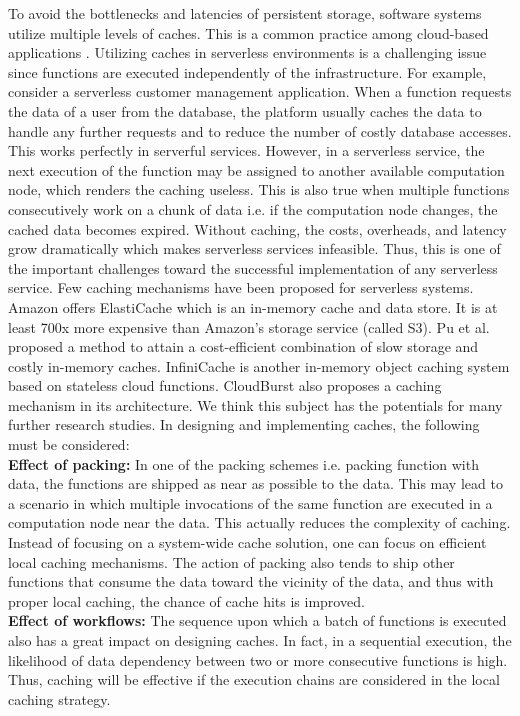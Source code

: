 \label{sec:caching}
To avoid the bottlenecks and latencies of persistent storage, software systems utilize multiple levels of caches. This is a common practice among cloud-based applications . Utilizing caches in serverless environments is a challenging issue since functions are executed independently of the infrastructure. For example, consider a serverless customer management application. When a function requests the data of a user from the database, the platform usually caches the data to handle any further requests and to reduce the number of costly database accesses. This works perfectly in serverful services. However, in a serverless service, the next execution of the function may be assigned to another available computation node, which renders the caching useless. This is also true when multiple functions consecutively work on a chunk of data i.e. if the computation node changes, the cached data becomes expired. Without caching, the costs, overheads, and latency grow dramatically which makes serverless services infeasible. Thus, this is one of the important challenges toward the successful implementation of any serverless service. Few caching mechanisms have been proposed for serverless systems. Amazon offers ElastiCache  which is an in-memory cache and data store. It is at least 700x more expensive than Amazon's storage service (called S3). Pu et al.  proposed a method to attain a cost-efficient combination of slow storage and costly in-memory caches. InfiniCache  is another in-memory object caching system based on stateless cloud functions. CloudBurst  also proposes a caching mechanism in its architecture.  
We think this subject has the potentials for many further research studies. In designing and implementing caches, the following must be considered:
\\
\noindent \textbf{Effect of packing:} In one of the packing schemes i.e. packing function with data, the functions are shipped as near as possible to the data. This may lead to a scenario in which multiple invocations of the same function are executed in a computation node near the data. This actually reduces the complexity of caching. Instead of focusing on a system-wide cache solution, one can focus on efficient local caching mechanisms. The action of packing also tends to ship other functions that consume the data toward the vicinity of the data, and thus with proper local caching, the chance of cache hits is improved.
\\
\noindent \textbf{Effect of workflows:} The sequence upon which a batch of functions is executed also has a great impact on designing caches. In fact, in a sequential execution, the likelihood of data dependency between two or more consecutive functions is high. Thus, caching will be effective if the execution chains are considered in the local caching strategy.
